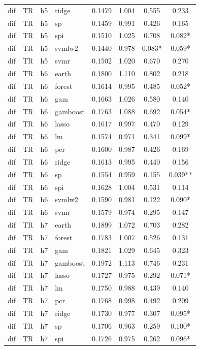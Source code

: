 \begin{ThreePartTable}
\begin{longtable}[t]{llclcccc}
dif & TR & h5 & ridge & 0.1479 & 1.004 & 0.555 & 0.233\\
dif & TR & h5 & sp & 0.1459 & 0.991 & 0.426 & 0.165\\
dif & TR & h5 & spi & 0.1510 & 1.025 & 0.708 & 0.082*\\
dif & TR & h5 & svmlw2 & 0.1440 & 0.978 & 0.083* & 0.059*\\
dif & TR & h5 & svmr & 0.1502 & 1.020 & 0.670 & 0.270\\
\addlinespace
dif & TR & h6 & earth & 0.1800 & 1.110 & 0.802 & 0.218\\
dif & TR & h6 & forest & 0.1614 & 0.995 & 0.485 & 0.052*\\
dif & TR & h6 & gam & 0.1663 & 1.026 & 0.580 & 0.140\\
dif & TR & h6 & gamboost & 0.1763 & 1.088 & 0.692 & 0.054*\\
dif & TR & h6 & lasso & 0.1617 & 0.997 & 0.470 & 0.129\\
dif & TR & h6 & lm & 0.1574 & 0.971 & 0.341 & 0.099*\\
dif & TR & h6 & pcr & 0.1600 & 0.987 & 0.426 & 0.169\\
dif & TR & h6 & ridge & 0.1613 & 0.995 & 0.440 & 0.156\\
dif & TR & h6 & sp & 0.1554 & 0.959 & 0.155 & 0.039**\\
dif & TR & h6 & spi & 0.1628 & 1.004 & 0.531 & 0.114\\
dif & TR & h6 & svmlw2 & 0.1590 & 0.981 & 0.122 & 0.090*\\
dif & TR & h6 & svmr & 0.1579 & 0.974 & 0.295 & 0.147\\
\addlinespace
dif & TR & h7 & earth & 0.1899 & 1.072 & 0.703 & 0.282\\
dif & TR & h7 & forest & 0.1783 & 1.007 & 0.526 & 0.131\\
dif & TR & h7 & gam & 0.1821 & 1.029 & 0.645 & 0.323\\
dif & TR & h7 & gamboost & 0.1972 & 1.113 & 0.746 & 0.231\\
dif & TR & h7 & lasso & 0.1727 & 0.975 & 0.292 & 0.071*\\
dif & TR & h7 & lm & 0.1750 & 0.988 & 0.439 & 0.140\\
dif & TR & h7 & pcr & 0.1768 & 0.998 & 0.492 & 0.209\\
dif & TR & h7 & ridge & 0.1730 & 0.977 & 0.307 & 0.095*\\
dif & TR & h7 & sp & 0.1706 & 0.963 & 0.259 & 0.100*\\
dif & TR & h7 & spi & 0.1726 & 0.975 & 0.262 & 0.096*\\

\end{longtable}
\end{ThreePartTable}
